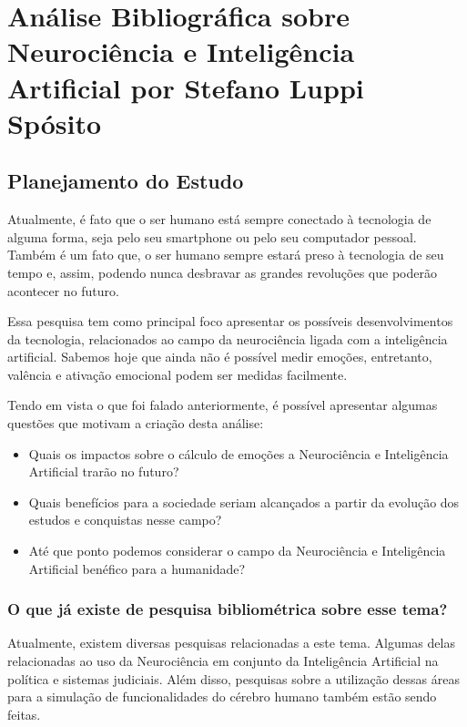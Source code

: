 \chapter{Análise Bibliográfica sobre Neurociência e Inteligência Artificial por Stefano Luppi Spósito\label{chap:bibliometria:kawaiistheno}}

\section{Planejamento do Estudo}

Atualmente, é fato que o ser humano está sempre conectado à tecnologia de alguma forma, seja pelo seu smartphone ou pelo seu computador pessoal. Também é um fato que, o ser humano sempre estará preso à tecnologia de seu tempo e, assim, podendo nunca desbravar as grandes revoluções que poderão acontecer no futuro.

Essa pesquisa tem como principal foco apresentar os possíveis desenvolvimentos da tecnologia, relacionados ao campo da neurociência ligada com a inteligência artificial. Sabemos hoje que ainda não é possível medir emoções, entretanto, valência e ativação emocional podem ser medidas facilmente.

Tendo em vista o que foi falado anteriormente, é possível apresentar algumas questões que motivam a criação desta análise:

\begin{itemize}
    \item Quais os impactos sobre o cálculo de emoções a Neurociência e Inteligência Artificial trarão no futuro?
    \item Quais benefícios para a sociedade seriam alcançados a partir da evolução dos estudos e conquistas nesse campo?
    \item Até que ponto podemos considerar o campo da Neurociência e Inteligência Artificial benéfico para a humanidade?
\end{itemize}

\subsection{O que já existe de pesquisa bibliométrica sobre esse tema?}

Atualmente, existem diversas pesquisas relacionadas a este tema. Algumas delas relacionadas ao uso da Neurociência em conjunto da Inteligência Artificial na política e sistemas judiciais. Além disso, pesquisas sobre a utilização dessas áreas para a simulação de funcionalidades do cérebro humano também estão sendo feitas.

